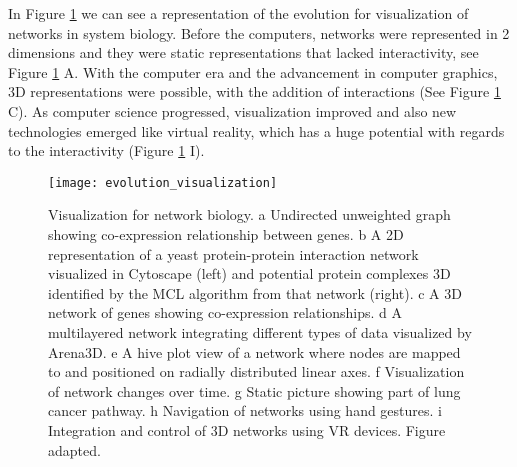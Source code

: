 In Figure \ref{fig:network_biology_evolution} we can see a representation of the evolution for visualization of networks in system biology. Before the computers, networks were represented in 2 dimensions and they were static representations that lacked interactivity, see Figure \ref{fig:network_biology_evolution} A. With the computer era and the advancement in computer graphics, 3D representations were possible, with the addition of interactions (See Figure  \ref{fig:network_biology_evolution} C). As computer science progressed, visualization improved and also new technologies emerged like virtual reality, which has a huge potential with regards to the interactivity (Figure \ref{fig:network_biology_evolution} I).

\begin{figure}[h!]
    \newlength{\tempheight}
    \setlength{\tempheight}{15ex}
    \centering%
    \texttt{[image: evolution\_visualization]}
    \caption{Visualization for network biology. a Undirected unweighted graph showing co-expression relationship between genes. b A 2D representation of a yeast protein-protein interaction network visualized in Cytoscape (left) and potential protein complexes 3D identified by the MCL algorithm from that network (right). c A 3D network of genes showing co-expression relationships. d A multilayered network integrating different types of data visualized by Arena3D. e A hive plot view of a network where nodes are mapped to and positioned on radially distributed linear axes. f Visualization of network changes over time. g Static picture showing part of lung cancer pathway. h Navigation of networks using hand gestures. i Integration and control of 3D networks using VR devices. Figure adapted\cite{pavlopoulos_malliarakis_papanikolaou_theodosiou_enright_iliopoulos_2015}.}
    \label{fig:network_biology_evolution}
\end{figure}

%
